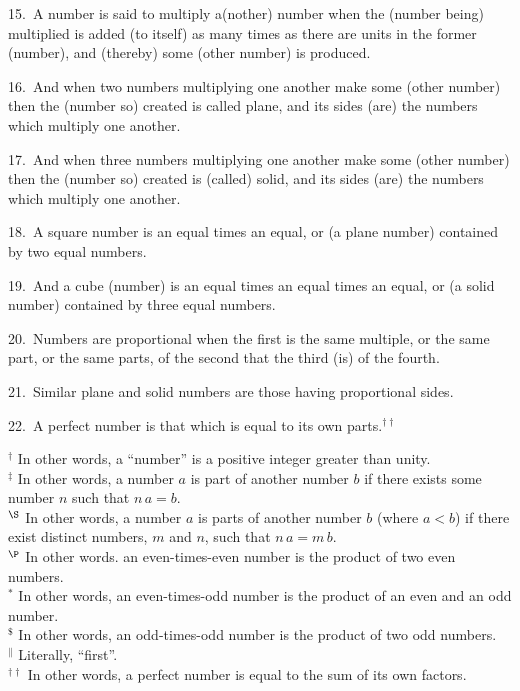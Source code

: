 15.~A number is said to multiply a(nother) number when the (number being) multiplied is added (to itself) as many times as there are units
 in the former (number), and (thereby) some (other number) is produced.
 
16.~And when two numbers multiplying one another make some
(other number) then the (number so) created  is called plane, and its sides (are) the numbers
which multiply one another.

17.~And when three numbers multiplying one another make some (other number)
then the (number so) created is (called) solid, and its sides (are) the numbers which multiply
one another.

18.~A square number is an equal times an equal, or (a plane number)
contained by two equal numbers.

19.~And a cube (number) is an equal times an equal times an equal,
or (a solid number) contained by three equal numbers.

20.~Numbers are proportional when the first is the same multiple, or
the same part, or the same parts,
of the second that the third (is) of the fourth.

21.~Similar plane and solid numbers are those having proportional
sides.

22.~A perfect number is that which is equal to its own parts.$^{\dag\dag}$

{\footnotesize\noindent$^\dag$ In other words, a
``number'' is a positive integer greater than unity.\\[0.5ex]
$^\ddag$ In other words, a number $a$ is part of
another number $b$ if there exists some number $n$ such
that $n\,a = b$.\\[0.5ex]
$^\S$  In other words, a number $a$ is parts of another number
$b$ (where $a<b$) if there exist distinct numbers, $m$ and $n$, such that $n\,a=m\,b$.\\[0.5ex]
$^\P$ In other words.
an even-times-even number is the product of two even numbers.\\[0.5ex]
$^\ast$ In other words,
an even-times-odd number is the product of an even and an odd number.\\[0.5ex]
$^\$$ In other words,
an odd-times-odd number is the product of two odd numbers.\\[0.5ex]
$^\|$ Literally, ``first''.\\[0.5ex]
$^{\dag\dag}$  In other words, a perfect number is equal to the sum of its own factors.}


